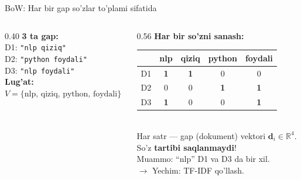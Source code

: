 \documentclass[aspectratio=169,11pt]{beamer}
\begin{document}
\begin{frame}{BoW: Har bir gap so'zlar to'plami sifatida}
  \begin{columns}[T]
    \begin{column}{0.40\textwidth}
      \textbf{3 ta gap:}\\[6pt]
      \small
      D1: \texttt{"nlp qiziq"}\\[3pt]
      D2: \texttt{"python foydali"}\\[3pt]
      D3: \texttt{"nlp foydali"}\\[10pt]
      \textbf{Lug'at:}\\
      $V = \{\text{nlp, qiziq, python, foydali}\}$
    \end{column}
    \begin{column}{0.56\textwidth}
      \textbf{Har bir so'zni sanash:}\\[4pt]
      \small
      \begin{tabular}{lcccc}
        \toprule
         & nlp & qiziq & python & foydali \\
        \midrule
        D1 & \textbf{1} & \textbf{1} & 0 & 0 \\
        D2 & 0 & 0 & \textbf{1} & \textbf{1} \\
        D3 & \textbf{1} & 0 & 0 & \textbf{1} \\
        \bottomrule
      \end{tabular}\\[6pt]
      \footnotesize
      Har satr --- gap (dokument) vektori $\mathbf{d}_i \in \mathbb{R}^4$.\\
      So'z \textbf{tartibi saqlanmaydi}!\\[3pt]
      \alert{Muammo}: ``nlp'' D1 va D3 da bir xil.\\
      $\to$ Yechim: TF-IDF qo'llash.
    \end{column}
  \end{columns}
\end{frame}
\end{document}
